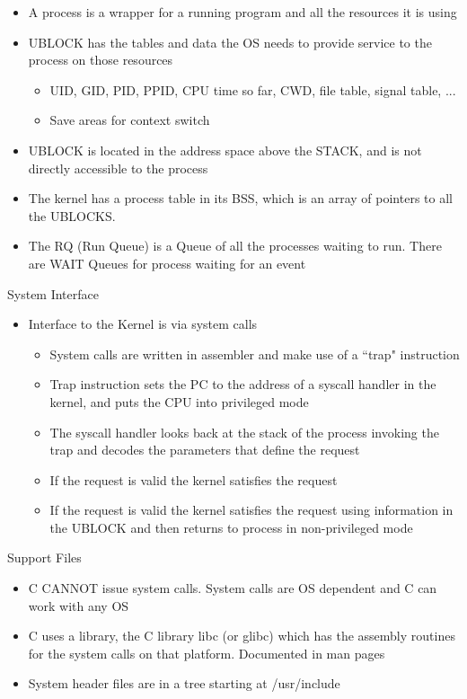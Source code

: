\begin{itemize}
    \item A process is a wrapper for a running program and all the resources it is using
    \item UBLOCK has the tables and data the OS needs to provide service to the process on those resources
    \begin{itemize}
        \item UID, GID, PID, PPID, CPU time so far, CWD, file table, signal table, ...
        \item Save areas for context switch
    \end{itemize}
    \item UBLOCK is located in the address space above the STACK, and is not directly accessible to the process
    \item The kernel has a process table in its BSS, which is an array of pointers to all the UBLOCKS.
    \item The RQ (Run Queue) is a Queue of all the processes waiting to run. There are WAIT Queues for process waiting for an event
\end{itemize}
System Interface
\begin{itemize}
    \item Interface to the Kernel is via system calls
    \begin{itemize}
        \item System calls are written in assembler and make use of a ``trap" instruction
        \item Trap instruction sets the PC to the address of a syscall handler in the kernel, and puts the CPU into privileged mode
        \item The syscall handler looks back at the stack of the process invoking the trap and decodes the parameters that define the request
        \item If the request is valid the kernel satisfies the request
        \item If the request is valid the kernel satisfies the request using information in the UBLOCK and then returns to process in non-privileged mode
    \end{itemize}
\end{itemize}
Support Files
\begin{itemize}
    \item C CANNOT issue system calls. System calls are OS dependent and C can work with any OS
    \item C uses a library, the C library libc (or glibc) which has the assembly routines for the system calls on that platform. Documented in man pages
    \item System header files are in a tree starting at /usr/include
\end{itemize}